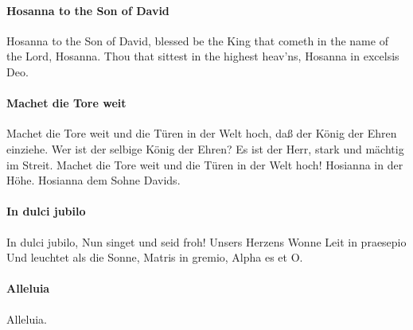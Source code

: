 \documentclass[11pt, ngermanm, titlepage]{article}
\begin{document}
\begin{multicols}{2}
	\paragraph{Hosanna to the Son of David\newline}
	Hosanna to the Son of David,\newline
	blessed be the King that cometh\newline
	in the name of the Lord, Hosanna.\newline
	Thou that sittest in the highest heav’ns,\newline
	Hosanna in excelsis Deo.
	
	\paragraph{Machet die Tore weit\newline}
	Machet die Tore weit\newline
	und die Türen in der Welt hoch,\newline
	daß der König der Ehren einziehe.\newline
	Wer ist der selbige König der Ehren?\newline
	Es ist der Herr,\newline
	stark und mächtig im Streit.\newline
	Machet die Tore weit\newline
	und die Türen in der Welt hoch!\newline
	Hosianna in der Höhe.\newline
	Hosianna dem Sohne Davids.
	
	\paragraph{In dulci jubilo\newline}
	In dulci jubilo,\newline
	Nun singet und seid froh!\newline
	Unsers Herzens Wonne\newline 
	Leit in praesepio\newline
	Und leuchtet als die Sonne,\newline
	Matris in gremio,\newline
	Alpha es et O.
	
	\paragraph{Alleluia\newline}
	Alleluia.
		
	\end{multicols}
	
\end{document}
